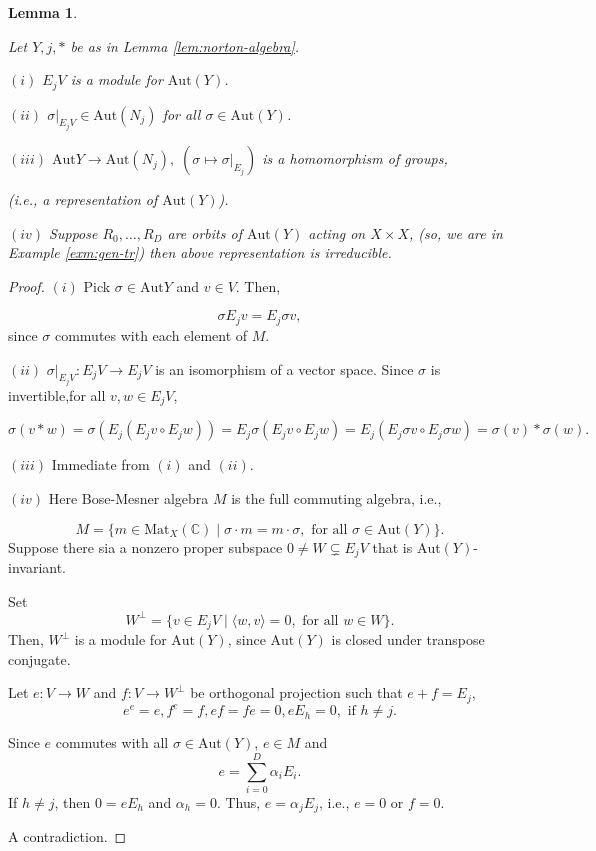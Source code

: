 \documentclass[
]{book}
\newtheorem{lemma}{Lemma}[chapter]
\theoremstyle{definition}
\theoremstyle{definition}
\theoremstyle{definition}
\theoremstyle{definition}
\theoremstyle{remark}
\begin{document}
\begin{lemma}
\protect\hypertarget{lem:autom-of-norton-algebra}{}\label{lem:autom-of-norton-algebra}

Let \(Y, j, \ast\) be as in Lemma \ref{lem:norton-algebra}.

\((i)\) \(E_jV\) is a module for \(\mathrm{Aut}(Y)\).

\((ii)\) \(\sigma|_{E_jV}\in \mathrm{Aut}(N_j)\) for all \(\sigma \in \mathrm{Aut}(Y)\).

\((iii)\) \(\mathrm{Aut}Y \longrightarrow \mathrm{Aut}(N_j), \; (\sigma \mapsto \sigma|_{E_j})\) is a homomorphism of groups,

(i.e., a representation of \(\mathrm{Aut}(Y)\)).

\((iv)\) Suppose \(R_0, \ldots, R_D\) are orbits of \(\mathrm{Aut}(Y)\) acting on \(X\times X\), (so, we are in Example \ref{exm:gen-tr}) then above representation is irreducible.

\end{lemma}

\begin{proof}
\leavevmode

\((i)\) Pick \(\sigma\in \mathrm{Aut}Y\) and \(v\in V\). Then,

\[\sigma E_j v = E_j\sigma v,\]
since \(\sigma\) commutes with each element of \(M\).

\((ii)\) \(\sigma|_{E_jV}: E_jV \to E_jV\) is an isomorphism of a vector space. Since \(\sigma\) is invertible,for all \(v,w\in E_jV\),

\[\sigma(v\ast w) = \sigma(E_j(E_jv\circ E_jw)) = E_j\sigma(E_jv\circ E_jw) = E_j(E_j\sigma v\circ E_j\sigma w) = \sigma(v)\ast \sigma(w).\]

\((iii)\) Immediate from \((i)\) and \((ii)\).

\((iv)\) Here Bose-Mesner algebra \(M\) is the full commuting algebra, i.e.,

\[M = \{m\in \mathrm{Mat}_X(\mathbb{C})\mid \sigma\cdot m = m\cdot \sigma, \text{ for all }\sigma\in \mathrm{Aut}(Y)\}.\]
Suppose there sia a nonzero proper subspace \(0\neq W\subsetneq E_jV\) that is \(\mathrm{Aut}(Y)\)-invariant.

Set
\[W^\bot = \{v\in E_jV\mid \langle w, v\rangle = 0, \text{ for all }w\in W\}.\]
Then, \(W^\bot\) is a module for \(\mathrm{Aut}(Y)\), since \(\mathrm{Aut}(Y)\) is closed under transpose conjugate.

Let \(e: V\to W\) and \(f: V\to W^\bot\) be orthogonal projection such that \(e + f = E_j\),
\[e^e = e, f^e = f, ef = fe = 0, eE_h = 0, \text{ if } h\neq j.\]

Since \(e\) commutes with all \(\sigma\in \mathrm{Aut}(Y)\), \(e\in M\) and
\[e = \sum_{i=0}^D \alpha_i E_i.\]
If \(h\neq j\), then \(0 = eE_h\) and \(\alpha_h = 0\). Thus, \(e = \alpha_jE_j\), i.e.,
\(e=0\) or \(f=0\).

A contradiction.

\end{proof}
\end{document}
